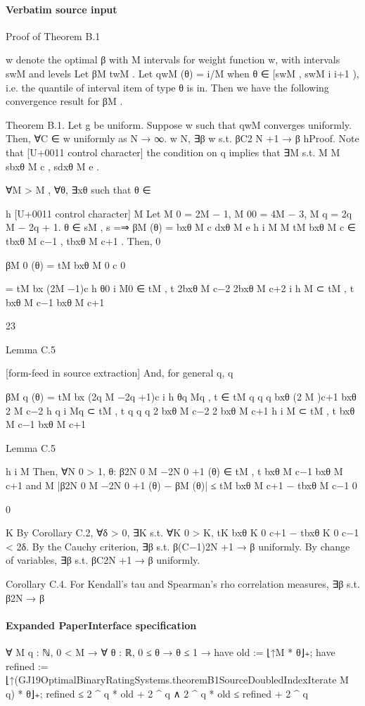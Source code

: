\documentclass[10pt]{article}
\begin{document}
\paragraph{Verbatim source input}
\begin{ReviewVerbatim}
Proof of Theorem B.1

w denote the optimal β with M intervals for weight function w, with intervals swM and levels
Let βM
twM . Let qwM (θ) = i/M when θ ∈ [swM
, swM
i
i+1 ), i.e. the quantile of interval item of type θ is in.
Then we have the following convergence result for βM .

Theorem B.1. Let g be uniform. Suppose w such that qwM converges uniformly. Then, ∀C ∈
w uniformly as N → ∞.
w
N, ∃β w s.t. βC2
N +1 → β
hProof. Note that
[U+0011 control character] the condition on q implies that ∃M s.t.
M
M
sbxθ M c , sdxθ M e .

∀M > M , ∀θ, ∃xθ such that θ ∈

h
[U+0011 control character]
M
Let M 0 = 2M − 1, M 00 = 4M − 3, M q = 2q M − 2q + 1. θ ∈ sM
,
s
=⇒ βM (θ) =
bxθ M c dxθ M e
h
i
M
M
tM
bxθ M c ∈ tbxθ M c−1 , tbxθ M c+1 . Then,
0

βM 0 (θ) = tM
bxθ M 0 c
0

= tM
bx (2M −1)c
h θ0
i
M0
∈ tM
,
t
2bxθ M c−2 2bxθ M c+2
i
h
M
⊂ tM
,
t
bxθ M c−1 bxθ M c+1

23

Lemma C.5


[form-feed in source extraction]
And, for general q,
q

βM q (θ) = tM
bx (2q M −2q +1)c
i
h θq
Mq
,
t
∈ tM
q
q
q
bxθ (2 M )c+1
bxθ 2 M c−2
h q
i
Mq
⊂ tM
,
t
q
q
q
2 bxθ M c−2
2 bxθ M c+1
h
i
M
⊂ tM
,
t
bxθ M c−1 bxθ M c+1

Lemma C.5

h
i
M
Then, ∀N 0 > 1, θ: β2N 0 M −2N 0 +1 (θ) ∈ tM
,
t
bxθ M c−1 bxθ M c+1 and
M
|β2N 0 M −2N 0 +1 (θ) − βM (θ)| ≤ tM
bxθ M c+1 − tbxθ M c−1
0

0

K
By Corollary C.2, ∀δ > 0, ∃K s.t. ∀K 0 > K, tK
bxθ K 0 c+1 − tbxθ K 0 c−1 < 2δ.
By the Cauchy criterion, ∃β s.t. β(C−1)2N +1 → β uniformly.
By change of variables, ∃β s.t. βC2N +1 → β uniformly.

Corollary C.4. For Kendall’s tau and Spearman’s rho correlation measures, ∃β s.t. β2N → β
\end{ReviewVerbatim}


\paragraph{Expanded PaperInterface specification}
\begin{ReviewVerbatim}
∀ {M q : ℕ},
  0 < M →
    ∀ {θ : ℝ},
      0 ≤ θ →
        θ ≤ 1 →
          have old := ⌊↑M * θ⌋₊;
          have refined := ⌊↑(GJ19OptimalBinaryRatingSystems.theoremB1SourceDoubledIndexIterate M q) * θ⌋₊;
          refined ≤ 2 ^ q * old + 2 ^ q ∧ 2 ^ q * old ≤ refined + 2 ^ q
\end{ReviewVerbatim}
\end{document}
